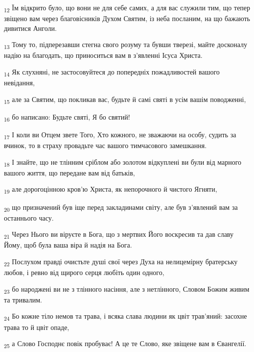 \begin{tcolorbox}
\textsubscript{12} Їм відкрито було, що вони не для себе самих, а для вас служили тим, що тепер звіщено вам через благовісників Духом Святим, із неба посланим, на що бажають дивитися Анголи.
\end{tcolorbox}
\begin{tcolorbox}
\textsubscript{13} Тому то, підперезавши стегна свого розуму та бувши тверезі, майте досконалу надію на благодать, що приноситься вам в з'явленні Ісуса Христа.
\end{tcolorbox}
\begin{tcolorbox}
\textsubscript{14} Як слухняні, не застосовуйтеся до попередніх пожадливостей вашого невідання,
\end{tcolorbox}
\begin{tcolorbox}
\textsubscript{15} але за Святим, що покликав вас, будьте й самі святі в усім вашім поводженні,
\end{tcolorbox}
\begin{tcolorbox}
\textsubscript{16} бо написано: Будьте святі, Я бо святий!
\end{tcolorbox}
\begin{tcolorbox}
\textsubscript{17} І коли ви Отцем звете Того, Хто кожного, не зважаючи на особу, судить за вчинок, то в страху провадьте час вашого тимчасового замешкання.
\end{tcolorbox}
\begin{tcolorbox}
\textsubscript{18} І знайте, що не тлінним сріблом або золотом відкуплені ви були від марного вашого життя, що передане вам від батьків,
\end{tcolorbox}
\begin{tcolorbox}
\textsubscript{19} але дорогоцінною кров'ю Христа, як непорочного й чистого Ягняти,
\end{tcolorbox}
\begin{tcolorbox}
\textsubscript{20} що призначений був іще перед закладинами світу, але був з'явлений вам за останнього часу.
\end{tcolorbox}
\begin{tcolorbox}
\textsubscript{21} Через Нього ви віруєте в Бога, що з мертвих Його воскресив та дав славу Йому, щоб була ваша віра й надія на Бога.
\end{tcolorbox}
\begin{tcolorbox}
\textsubscript{22} Послухом правді очистьте душі свої через Духа на нелицемірну братерську любов, і ревно від щирого серця любіть один одного,
\end{tcolorbox}
\begin{tcolorbox}
\textsubscript{23} бо народжені ви не з тлінного насіння, але з нетлінного, Словом Божим живим та тривалим.
\end{tcolorbox}
\begin{tcolorbox}
\textsubscript{24} Бо кожне тіло немов та трава, і всяка слава людини як цвіт трав'яний: засохне трава то й цвіт опаде,
\end{tcolorbox}
\begin{tcolorbox}
\textsubscript{25} а Слово Господнє повік пробуває! А це те Слово, яке звіщене вам в Євангелії.
\end{tcolorbox}
